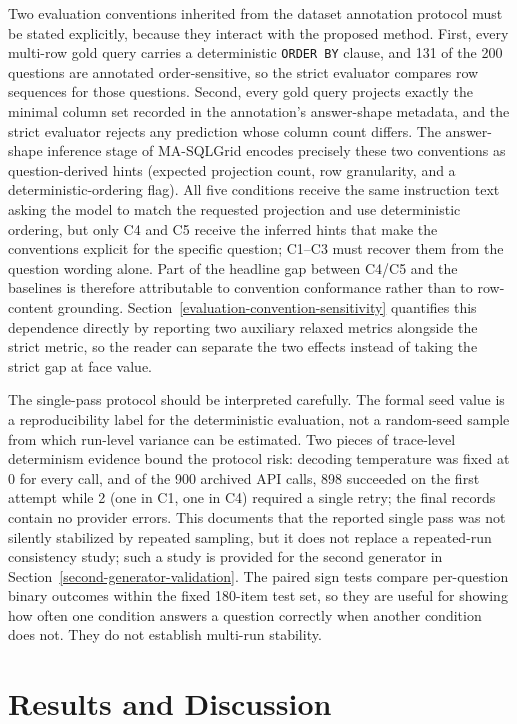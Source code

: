 \documentclass[cmc,article,submit,moreauthors,pdftex]{Definitions/tsp}
\begin{document}
Two evaluation conventions inherited from the dataset annotation protocol must be stated explicitly, because they interact with the proposed method. First, every multi-row gold query carries a deterministic \texttt{ORDER BY} clause, and 131 of the 200 questions are annotated order-sensitive, so the strict evaluator compares row sequences for those questions. Second, every gold query projects exactly the minimal column set recorded in the annotation's answer-shape metadata, and the strict evaluator rejects any prediction whose column count differs. The answer-shape inference stage of MA-SQLGrid encodes precisely these two conventions as question-derived hints (expected projection count, row granularity, and a deterministic-ordering flag). All five conditions receive the same instruction text asking the model to match the requested projection and use deterministic ordering, but only C4 and C5 receive the inferred hints that make the conventions explicit for the specific question; C1--C3 must recover them from the question wording alone. Part of the headline gap between C4/C5 and the baselines is therefore attributable to convention conformance rather than to row-content grounding. Section~\ref{evaluation-convention-sensitivity} quantifies this dependence directly by reporting two auxiliary relaxed metrics alongside the strict metric, so the reader can separate the two effects instead of taking the strict gap at face value.

The single-pass protocol should be interpreted carefully. The formal seed value is a reproducibility label for the deterministic evaluation, not a random-seed sample from which run-level variance can be estimated. Two pieces of trace-level determinism evidence bound the protocol risk: decoding temperature was fixed at 0 for every call, and of the 900 archived API calls, 898 succeeded on the first attempt while 2 (one in C1, one in C4) required a single retry; the final records contain no provider errors. This documents that the reported single pass was not silently stabilized by repeated sampling, but it does not replace a repeated-run consistency study; such a study is provided for the second generator in Section~\ref{second-generator-validation}. The paired sign tests compare per-question binary outcomes within the fixed 180-item test set, so they are useful for showing how often one condition answers a question correctly when another condition does not. They do not establish multi-run stability.

\section{Results and Discussion}\label{results}
\end{document}
